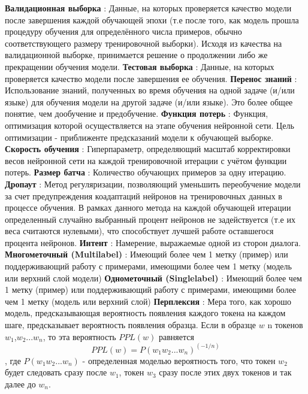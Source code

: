 \textbf{Валидационная выборка} : Данные, на которых проверяется качество модели после завершения каждой обучающей эпохи (т.е после того, как модель прошла процедуру обучения для определённого числа примеров, обычно соответствующего размеру тренировочной выборки). Исходя из качества на валидационной выборке, принимается решение о продолжении либо же прекращении обучения модели. 
\textbf{Тестовая выборка} : Данные, на которых проверяется качество модели после завершения ее обучения. 
\textbf{Перенос знаний} : Использование знаний, полученных во время обучения на одной задаче (и/или языке) для обучения модели на другой задаче (и/или языке). Это более общее понятие, чем дообучение и предобучение.
\textbf{Функция потерь} : Функция, оптимизация которой осуществляется на этапе обучения нейронной сети. Цель оптимизации - приближенте предсказаний модели к обучающей выборке. 
\textbf{Скорость обучения} : Гиперпараметр, определяющий масштаб корректировки весов нейронной сети на каждой тренировочной итерации с учётом функции потерь. 
\textbf{Размер батча} : Количество обучающих примеров за одну итерацию.
\textbf{Дропаут} : Метод регуляризации, позволяющий уменьшить переобучение модели за счет предупреждения коадаптаций нейронов на тренировочных данных в процессе обучения. В рамках данного метода на каждой обучающей итерации определенный случайно выбранный процент нейронов не задействуется (т.е их веса считаются нулевыми), что способствует лучшей работе оставшегося процента нейронов. 
\textbf{Интент} : Намерение, выражаемые одной из сторон диалога.
\textbf{Многометочный (Multilabel)} : Имеющий более чем 1 метку (пример) или поддерживающий работу с примерами, имеющими более чем 1 метку (модель или верхний слой модели)
\textbf{Однометочный (Singlelabel)} : Имеющий более чем 1 метку (пример) или поддерживающий работу с примерами, имеющими более чем 1 метку (модель или верхний слой)
\textbf{Перплексия} : Мера того, как хорошо модель, предсказывающая вероятность появления каждого токена на каждом шаге, предсказывает вероятность появления образца. Если в образце $w$ n токенов $w_1$,$w_2$...$w_n$, то эта вероятность $PPL(w)$ равняется
\begin{equation} 
PPL(w) = P(w_1w_2... w_n)^(-1/n)
\end{equation},
где $P(w_1w_2... w_n)$ - определенная моделью вероятность того, что токен $w_2$ будет следовать сразу после $w_1$, токен $w_3$ сразу после этих двух токенов и так далее до $w_n$. 

